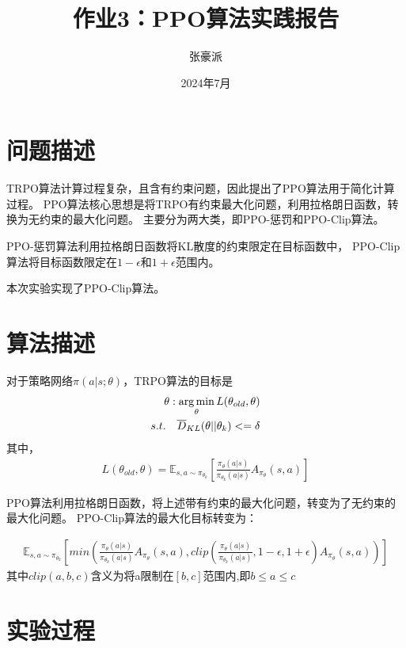 \documentclass{article}
\begin{document}
\title{作业3：PPO算法实践报告}
\author{张豪派}
\date{2024年7月}
\maketitle
\thispagestyle{fancy} %


\section{问题描述}
TRPO算法计算过程复杂，且含有约束问题，因此提出了PPO算法用于简化计算过程。
PPO算法核心思想是将TRPO有约束最大化问题，利用拉格朗日函数，转换为无约束的最大化问题。
主要分为两大类，即PPO-惩罚和PPO-Clip算法。
\par
PPO-惩罚算法利用拉格朗日函数将KL散度的约束限定在目标函数中，
PPO-Clip算法将目标函数限定在$1-\epsilon$和$1+\epsilon$范围内。
\par
本次实验实现了PPO-Clip算法。

\section{算法描述}
\noindent 对于策略网络$\pi(a|s;\theta)$，TRPO算法的目标是
\begin{align}
\theta:\mathop{\arg\min}\limits_{\theta}L(\theta_{old}, \theta) \notag
\\ s.t. \quad \overline{D}_{KL}(\theta || \theta_{k}) <= \delta
\end{align}
\noindent 其中，
\begin{align}
L(\theta_{old}, \theta)=\mathbb{E}_{s,a\sim\pi_{\theta_k}}[\frac{\pi_\theta(a|s)}{\pi_{\theta_{k}}(a|s)}A_{\pi_\theta}(s,a)]
\label{opti:sub3}
\end{align} 

\noindent PPO算法利用拉格朗日函数，将上述带有约束的最大化问题，转变为了无约束的最大化问题。
PPO-Clip算法的最大化目标转变为：

\begin{align}
  \mathbb{E}_{s,a\sim\pi_{\theta_k}}
  [min(\frac{\pi_\theta(a|s)}{\pi_{\theta_{k}}(a|s)}A_{\pi_\theta}(s,a), 
  clip(\frac{\pi_\theta(a|s)}{\pi_{\theta_{k}}(a|s)},1-\epsilon,1+\epsilon)A_{\pi_\theta}(s,a))]
  \label{opti:sub4}
\end{align} 
\noindent 其中$clip(a,b,c)$含义为将a限制在$[b,c]$范围内,即$b \leq a \leq c$



\section{实验过程}
\end{document}
